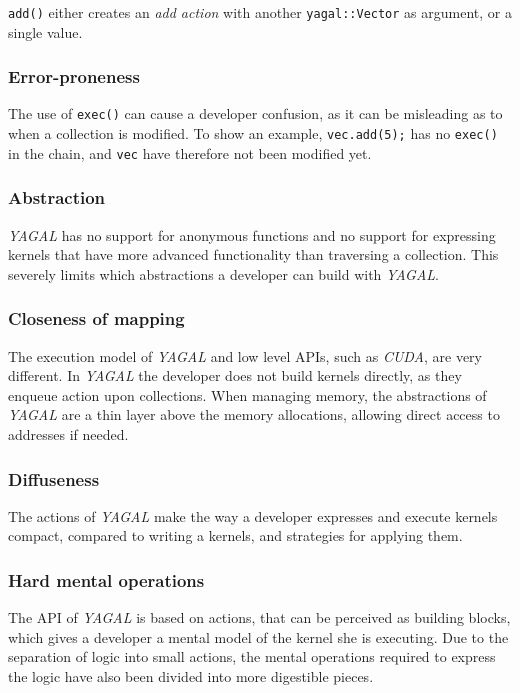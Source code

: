 \texttt{add()} either creates an \textit{add action} with another \texttt{yagal::Vector} as argument, or a single value.

\subsubsection[*]{Error-proneness}
The use of \texttt{exec()} can cause a developer confusion, as it can be misleading as to when a collection is modified. To show an example,
\texttt{vec.add(5);} has no \texttt{exec()} in the chain, and \texttt{vec} have therefore not been modified yet.

\subsubsection[*]{Abstraction}
\textit{YAGAL} has no support for anonymous functions and no support for expressing kernels that have more advanced functionality than traversing a collection. This severely limits which abstractions a developer can build with \textit{YAGAL}.

\subsubsection[*]{Closeness of mapping}
The execution model of \textit{YAGAL} and low level APIs, such as \textit{CUDA}, are very different. In \textit{YAGAL} the developer does not build kernels directly, as they enqueue action upon collections. When managing memory, the abstractions of \textit{YAGAL} are a thin layer above the memory allocations, allowing direct access to addresses if needed.

\subsubsection[*]{Diffuseness}
The actions of \textit{YAGAL} make the way a developer expresses and execute kernels compact, compared to writing a kernels, and strategies for applying them.

\subsubsection[*]{Hard mental operations}
The API of \textit{YAGAL} is based on actions, that can be perceived as building blocks, which gives a developer a mental model of the kernel she is executing. Due to the separation of logic into small actions, the mental operations required to express the logic have also been divided into more digestible pieces.

